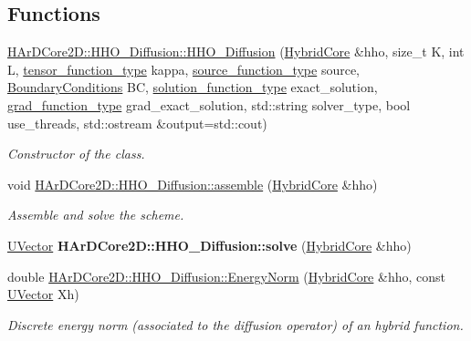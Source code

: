 \subsection*{Functions}
\begin{DoxyCompactItemize}
\item 
\hyperlink{group__HHO__Diffusion_ga5dd0238ced5e1ace4c0581d779e4e76d}{H\+Ar\+D\+Core2\+D\+::\+H\+H\+O\+\_\+\+Diffusion\+::\+H\+H\+O\+\_\+\+Diffusion} (\hyperlink{classHArDCore2D_1_1HybridCore}{Hybrid\+Core} \&hho, size\+\_\+t K, int L, \hyperlink{classHArDCore2D_1_1HHO__Diffusion_a5c4f7bf42c46d5bd8fde47396c2a9de5}{tensor\+\_\+function\+\_\+type} kappa, \hyperlink{classHArDCore2D_1_1HHO__Diffusion_afc8040de1122421f070bb19231db5431}{source\+\_\+function\+\_\+type} source, \hyperlink{classBoundaryConditions}{Boundary\+Conditions} BC, \hyperlink{classHArDCore2D_1_1HHO__Diffusion_ad64a9a3249e7345e7dbaafb7b578f524}{solution\+\_\+function\+\_\+type} exact\+\_\+solution, \hyperlink{classHArDCore2D_1_1HHO__Diffusion_a9f9412bc2a0a28033591d2e8a5750d90}{grad\+\_\+function\+\_\+type} grad\+\_\+exact\+\_\+solution, std\+::string solver\+\_\+type, bool use\+\_\+threads, std\+::ostream \&output=std\+::cout)
\begin{DoxyCompactList}\small\item\em Constructor of the class. \end{DoxyCompactList}\item 
\mbox{\label{group__HHO__Diffusion_gaa78a74bda050f0773e920c00c297c858}} 
void \hyperlink{group__HHO__Diffusion_gaa78a74bda050f0773e920c00c297c858}{H\+Ar\+D\+Core2\+D\+::\+H\+H\+O\+\_\+\+Diffusion\+::assemble} (\hyperlink{classHArDCore2D_1_1HybridCore}{Hybrid\+Core} \&hho)
\begin{DoxyCompactList}\small\item\em Assemble and solve the scheme. \end{DoxyCompactList}\item 
\mbox{\label{group__HHO__Diffusion_ga512e1affea54022987a1be1cdd9a5dd3}} 
\hyperlink{classHArDCore2D_1_1UVector}{U\+Vector} {\bfseries H\+Ar\+D\+Core2\+D\+::\+H\+H\+O\+\_\+\+Diffusion\+::solve} (\hyperlink{classHArDCore2D_1_1HybridCore}{Hybrid\+Core} \&hho)
\item 
\mbox{\label{group__HHO__Diffusion_ga9f9382eebdf3542db2e11d7770e90565}} 
double \hyperlink{group__HHO__Diffusion_ga9f9382eebdf3542db2e11d7770e90565}{H\+Ar\+D\+Core2\+D\+::\+H\+H\+O\+\_\+\+Diffusion\+::\+Energy\+Norm} (\hyperlink{classHArDCore2D_1_1HybridCore}{Hybrid\+Core} \&hho, const \hyperlink{classHArDCore2D_1_1UVector}{U\+Vector} Xh)
\begin{DoxyCompactList}\small\item\em Discrete energy norm (associated to the diffusion operator) of an hybrid function. \end{DoxyCompactList}\end{DoxyCompactItemize}


